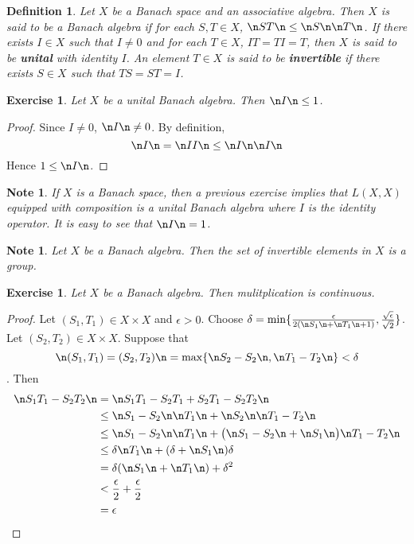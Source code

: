 \documentclass[12pt]{amsart}
\newtheorem{defn}[thm]{Definition}
\newtheorem{note}[thm]{Note}
\newtheorem{ex}[thm]{Exercise}
\newcommand{\del}{\delta}
\newcommand{\ep}{\epsilon}
\begin{document}
\begin{defn}
	Let $X$ be a Banach space and an associative algebra. Then $X$ is said to be a Banach algebra if for each $S,T \in X$, $\n ST \n \leq \n S \n \n T \n$. If there exists $I \in X$ such that $I \neq 0$ and for each $T \in X$, $IT = TI = T$, then $X$ is said to be \textbf{unital} with identity $I$. An element $T \in X$ is said to be \textbf{invertible} if there exists $S \in X$ such that $TS=ST = I$.
\end{defn}

\begin{ex}
	Let $X$ be a unital Banach algebra. Then $\n I \n \leq 1$. 
\end{ex}

\begin{proof}
	Since $I \neq 0$, $\n I \n \neq 0$. By definition, $$\n I \n = \n I I \n \leq \n I \n \n I \n $$ Hence $1 \leq \n I \n $.
\end{proof}

\begin{note}
	If $X$ is a Banach space, then a previous exercise implies that $L(X,X)$ equipped with composition is a unital Banach algebra where $I$ is the identity operator. It is easy to see that $\n I \n =1$.
\end{note}

\begin{note}
	Let $X$ be a  Banach algebra. Then the set of invertible elements in $X$ is a group.  
\end{note}

\begin{ex}
	Let $X$ be a Banach algebra. Then mulitplication is continuous. 
\end{ex}

\begin{proof}
	Let $(S_1,T_1) \in X \times X$ and $\ep > 0$. Choose $\del = \min\{\frac{\ep}{2(\n S_1 \n + \n T_1 \n +1)}, \frac{\sqrt{\ep}}{\sqrt{2}}\}$. Let $(S_2, T_2) \in X \times X$. Suppose that $$\n (S_1, T_1) = (S_2, T_2) \n = \max \{ \n S_2 -S_2 \n , \n T_1 - T_2 \n\} < \del$$. Then 
	\begin{align*}
		\n S_1T_1 - S_2T_2 \n 
		&= \n S_1T_1 - S_2T_1 +S_2T_1 - S_2T_2 \n \\
		& \leq \n S_1 -S_2 \n \n T_1 \n + \n S_2 \n \n T_1 - T_2 \n \\
		& \leq \n S_1 -S_2 \n \n T_1 \n + \big( \n S_1-S_2 \n + \n S_1 \n\big) \n T_1 - T_2 \n\\
		& \leq \del \n T_1 \n +(\del + \n S_1 \n) \del \\
		&= \del (\n S_1 \n + \n T_1 \n) + \del^2 \\
		& < \frac{\ep}{2} + \frac{\ep}{2}\\
		&= \ep
	\end{align*}
\end{proof}
\end{document}
